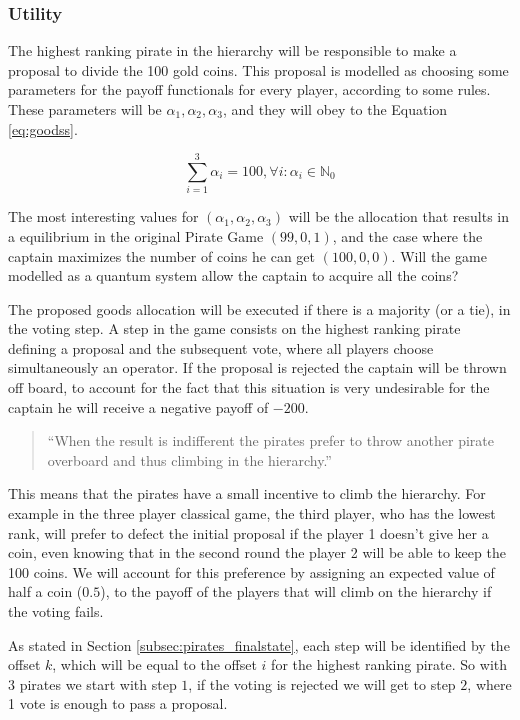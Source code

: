\subsubsection{Utility}
\label{subsec:pirates_utility}

The highest ranking pirate in the hierarchy will be responsible to make a proposal to divide the 100 gold coins. This proposal is modelled as choosing some parameters for the payoff functionals for every player, according to some rules. These parameters will be $\alpha_{1}, \alpha_{2}, \alpha_{3}$, and they will obey to the Equation \ref{eq:goodss}. 

\begin{equation}
\label{eq:goodss}
\sum_{i=1}^{3}\alpha_{i}=100, \forall i :\alpha_{i}\in\mathbb{N}_{0}
\end{equation}

The most interesting values for $(\alpha_{1}, \alpha_{2}, \alpha_{3})$ will be the allocation that results in a equilibrium in the original Pirate Game $(99, 0, 1)$, and the case where the captain maximizes the number of coins he can get $(100, 0, 0)$. Will the game modelled as a quantum system allow the captain to acquire all the coins?

The proposed goods allocation will be executed if there is a majority (or a tie), in the voting step. A step in the game consists on the highest ranking pirate defining a proposal and the subsequent vote, where all players choose simultaneously an operator. If the proposal is rejected the captain will be thrown off board, to account for the fact that this situation is very undesirable for the captain he will receive a negative payoff of $-200$.

\begin{quotation}
``When the result is indifferent the pirates prefer to throw another pirate overboard and thus climbing in the hierarchy.''
\end{quotation}

This means that the pirates have a small incentive to climb the hierarchy. For example in the three player classical game, the third player, who has the lowest rank, will prefer to defect the initial proposal if the player 1 doesn't give her a coin, even knowing that in the second round the player 2 will be able to keep the 100 coins. We will account for this preference by assigning an expected value of half a coin ($0.5$), to the payoff of the players that will climb on the hierarchy if the voting fails.

As stated in Section \ref{subsec:pirates_finalstate}, each step will be identified by the offset $k$, which will be equal to the offset $i$ for the highest ranking pirate. So with $3$ pirates we start with step $1$, if the voting is rejected we will get to step $2$, where 1 vote is enough to pass a proposal.

